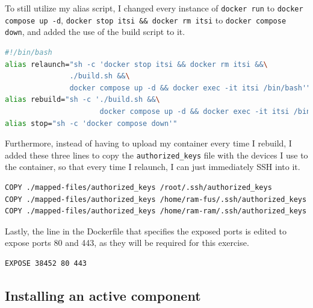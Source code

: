 \documentclass[a4paper]{article}
\begin{document}
\newpage
To still utilize my alias script, I changed every instance of \texttt{docker run} to \texttt{docker compose up -d}, \texttt{docker stop itsi \&\& docker rm itsi} to \texttt{docker compose down}, and added the use of the build script to it.
\begin{lstlisting}[language=bash]
#!/bin/bash
alias relaunch="sh -c 'docker stop itsi && docker rm itsi &&\
		       ./build.sh &&\
		       docker compose up -d && docker exec -it itsi /bin/bash'"
alias rebuild="sh -c './build.sh &&\
                      docker compose up -d && docker exec -it itsi /bin/bash'"
alias stop="sh -c 'docker compose down'"
\end{lstlisting}
Furthermore, instead of having to upload my container every time I rebuild, I added these three lines to copy the \texttt{authorized\_keys} file with the devices I use to the container, so that every time I relaunch, I can just immediately SSH into it.
\begin{lstlisting}[language=bash]
COPY ./mapped-files/authorized_keys /root/.ssh/authorized_keys
COPY ./mapped-files/authorized_keys /home/ram-fus/.ssh/authorized_keys
COPY ./mapped-files/authorized_keys /home/ram-ram/.ssh/authorized_keys
\end{lstlisting}
Lastly, the line in the Dockerfile that specifies the exposed ports is edited to expose ports 80 and 443, as they will be required for this exercise.
\begin{lstlisting}[language=bash]
EXPOSE 38452 80 443
\end{lstlisting}
\newpage
\subsection{Installing an active component}
\end{document}

